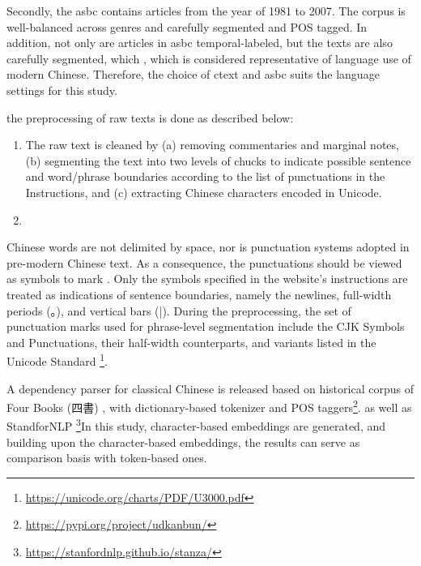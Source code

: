 Secondly, the \gls{asbc} contains articles from the year of 1981 to 2007. The corpus is well-balanced across genres and carefully segmented and POS tagged. In addition, not only are articles in \gls{asbc} temporal-labeled, but the texts are also carefully segmented, which , which is considered representative of language use of modern Chinese. Therefore, the choice of \gls{ctext} and \gls{asbc} suits the language settings for this study.

the preprocessing of raw texts is done as described below:

\begin{enumerate}[label={(\arabic*)}]
    \item The raw text is cleaned by (a) removing commentaries and marginal notes, (b) segmenting the text into two levels of chucks to indicate possible sentence and word/phrase boundaries according to the list of punctuations in the Instructions, and (c) extracting Chinese characters encoded in Unicode.
    \item 
\end{enumerate} 

Chinese words are not delimited by space, nor is punctuation systems adopted in pre-modern Chinese text. As a consequence, the punctuations  should be viewed as symbols to mark . Only the symbols specified in the website's instructions are treated as indications of sentence boundaries, namely the newlines, full-width periods (。), and vertical bars (|). During the preprocessing, the set of punctuation marks used for phrase-level segmentation include the CJK Symbols and Punctuations, their half-width counterparts, and variants listed in the Unicode Standard \footnote{\url{https://unicode.org/charts/PDF/U3000.pdf}}.

A dependency parser for classical Chinese is released based on historical corpus of Four Books (四書) \parencite{yasuoka2019universal}, with dictionary-based tokenizer and POS taggers\footnote{\url{https://pypi.org/project/udkanbun/}}. as well as StandforNLP \footnote{\url{https://stanfordnlp.github.io/stanza/}}In this study, character-based embeddings are generated, and building upon the character-based embeddings, the results can serve as comparison basis with token-based ones.

